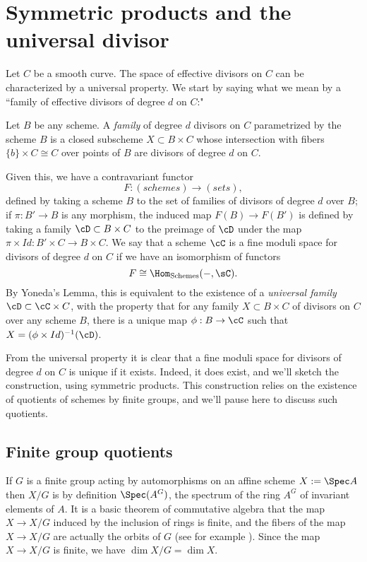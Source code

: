 \section{Symmetric products and the universal divisor}\label{symmetric section}

Let $C$ be a smooth curve. The space of effective divisors on $C$ can be characterized by a universal property. We start by saying what we mean by a ``family of effective divisors of degree $d$ on $C$:"

\begin{definition}
Let $B$ be any scheme. A \emph{family} of degree $d$ divisors on $C$ parametrized by the scheme $B$ is a closed subscheme $X\subset B\times C$ whose intersection with fibers $\{b\} \times C \cong C$ over points of $B$ are divisors of degree $d$ on $C$.
\end{definition}

Given this, we have a contravariant functor 
$$
F : (schemes) \to (sets),
$$
defined by taking a scheme $B$ to the set of families of divisors of degree $d$ over $B$; if $\pi : B' \to B$ is any morphism, the induced map $F(B) \to F(B')$ is defined by taking a family $\cD \subset B \times C$ to the preimage of $\cD$ under the map $\pi \times Id : B' \times C \to B \times C$. We say that a scheme $\cC$ is a fine moduli space for divisors of degree $d$ on $C$ if we have an isomorphism of functors
$$
F \cong \Hom_{\rm{Schemes}}( -, \sC).
$$
By Yoneda's Lemma, this is equivalent to the existence of a \emph{universal family} $\cD \subset \cC \times C$, with the property that for any family $X \subset B \times C$ of divisors on $C$ over any scheme $B$, there is a unique map $\phi : B \to \cC$ such that $X = (\phi \times Id)^{-1}(\cD)$.

From the universal property it is clear that a fine moduli space for divisors of degree $d$ on $C$ is unique if it exists. Indeed, it does exist, and we'll sketch the construction, using symmetric products. This construction relies on the existence of quotients of schemes by finite groups, and we'll pause here to discuss such quotients.

\subsection{Finite group quotients}

If $G$ is a finite group acting by automorphisms on an affine scheme $X:=\Spec A$ then $X/G$ is by definition $\Spec(A^G)$, the spectrum of the ring $A^G$ of invariant elements of $A$. It is a basic theorem of commutative algebra that the map $X\to X/G$ induced by the inclusion of rings is finite, and the fibers of the map $X\to X/G$ are actually the orbits of $G$ (see for example \cite[Proposition 13.10]{Eisenbud1995}).  Since the map $X\to X/G$ is finite, we have $\dim X/G = \dim X$. 

